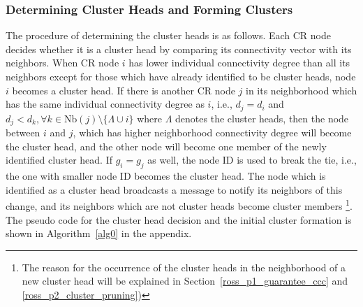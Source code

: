 \documentclass[10pt,journal,compsoc]{IEEEtran}
\theoremstyle{mytheoremstyle}
\theoremstyle{mytheoremstyle}
\theoremstyle{mytheoremstyle}
\newcommand{\ie}{i.e., }
\begin{document}
\subsubsection{Determining Cluster Heads and Forming Clusters}
The procedure of determining the cluster heads is as follows.
Each CR node decides whether it is a cluster head by comparing its connectivity vector with its neighbors.
When CR node $i$ has lower individual connectivity degree than all its neighbors except for those which have already identified to be cluster heads, node $i$ becomes a cluster head.
If there is another CR node $j$ in its neighborhood which has the same individual connectivity degree as $i$, \ie $d_j = d_i$ and $d_j < d_{k}, \forall k\in \text{Nb}(j)\setminus \{\Lambda\cup i\}$ where $\Lambda$ denotes the cluster heads, then the node between $i$ and $j$, which has higher neighborhood connectivity degree will become the cluster head, and the other node will become one member of the newly identified cluster head. 
If $g_i = g_j$ as well, the node ID is used to break the tie, \ie the one with smaller node ID becomes the cluster head.
%
The node which is identified as a cluster head broadcasts a message to notify its neighbors of this change, and its neighbors which are not cluster heads become cluster members
\footnote{The reason for the occurrence of the cluster heads in the neighborhood of a new cluster head will be explained in Section~\ref{ross_p1_guarantee_ccc} and \ref{ross_p2_cluster_pruning})}.
The pseudo code for the cluster head decision and the initial cluster formation is shown in Algorithm~\ref{alg0} in the appendix.
\end{document}
